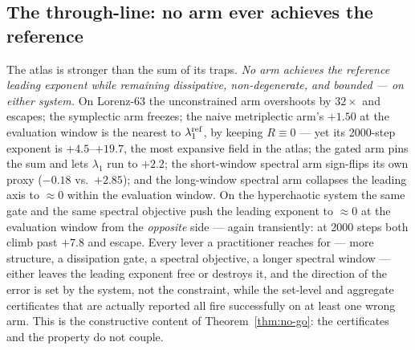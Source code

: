 \documentclass[journal]{IEEEtran}
\begin{document}
\subsection{The through-line: no arm ever achieves the reference}
The atlas is stronger than the sum of its traps. \emph{No arm achieves
the reference leading exponent while remaining dissipative,
non-degenerate, and bounded --- on either system.} On Lorenz-63 the
unconstrained arm overshoots by $32\times$ and escapes; the
symplectic arm freezes; the naive
metriplectic arm's $+1.50$ at the evaluation window is the nearest to
$\lambda_1^{\rm ref}$, by keeping $R\equiv0$ --- yet its 2000-step
exponent is $+4.5$--$+19.7$, the most expansive field in the atlas;
the gated arm pins the sum and lets $\lambda_1$ run to $+2.2$; the
short-window spectral arm sign-flips its own proxy ($-0.18$ vs.\
$+2.85$); and the long-window spectral arm collapses the leading axis
to $\approx0$ within the evaluation window. On the hyperchaotic
system the same gate and the same spectral objective push the leading
exponent to $\approx0$ at the evaluation window from the
\emph{opposite} side --- again transiently: at 2000 steps both climb
past $+7.8$ and escape. Every lever a practitioner reaches for ---
more structure, a dissipation gate, a spectral objective, a longer
spectral window --- either leaves the leading exponent free or
destroys it, and the direction of the error is set by the system, not
the constraint, while the set-level and aggregate certificates that
are actually reported all fire successfully on at least one wrong arm.
This is the constructive content of Theorem~\ref{thm:no-go}: the
certificates and the property do not couple.
\end{document}
